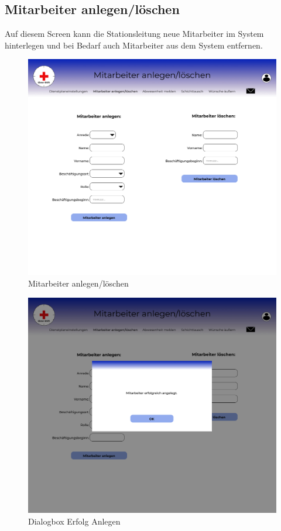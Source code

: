\documentclass[11pt,
paper=a4,
bibtotocnumbered,	  %
liststotocnumbered,  %
DIV=calc,		  %
tablecaptionabove,	  %
headinclude,
]{article}
\begin{document}
\subsection{Mitarbeiter anlegen/löschen}
Auf diesem Screen kann die Stationsleitung neue Mitarbeiter im System hinterlegen und bei Bedarf auch Mitarbeiter aus dem System entfernen.
\begin{figure}[H]
\includegraphics[width=1\textwidth]{Bilder/Screens/MAanlegen_Loeschen.jpg}{\centering}
\caption{Mitarbeiter anlegen/löschen}
\end{figure}
\begin{figure}[H]
\includegraphics[width=1\textwidth]{Bilder/Screens/loeschen-Dialogbox(1).jpg}{\centering}
\caption{Dialogbox Erfolg Anlegen}
\end{figure}
\end{document}
